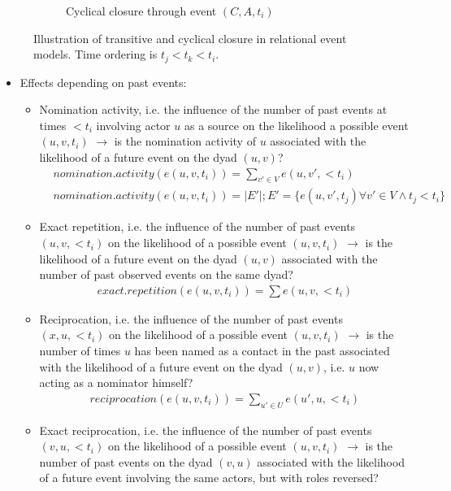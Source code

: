 \begin{figure}
\begin{subfigure}[t]{0.2\linewidth}
		\caption{Cyclical closure through event $(C,A,t_i)$}
	\end{subfigure}
	\caption{Illustration of transitive and cyclical closure in relational event models. Time ordering is $t_j < t_k < t_i$.}
	\label{fig:rem_closure}
\end{figure}

\begin{itemize}
	\item Effects depending on past events:
	\begin{itemize}
		\item Nomination activity, i.e. the influence of the number of past events at times $<t_i$ involving actor $u$ as a source on the likelihood a possible event $(u,v,t_i)$ $\rightarrow$ is the nomination activity of $u$ associated with the likelihood of a future event on the dyad $(u,v)$?
		\begin{align*}
			&nomination.activity(e(u,v,t_i)) = \sum_{v' \in V} e(u,v',<t_i)&&\\
			&nomination.activity(e(u,v,t_i)) = \lvert E' \rvert; E' = \{e(u,v',t_j) \forall v' \in V \land t_j < t_i\}
		\end{align*}
		\item Exact repetition, i.e. the influence of the number of past events $(u,v,<t_i)$ on the likelihood of a possible event $(u,v,t_i)$ $\rightarrow$ is the likelihood of a future event on the dyad $(u,v)$ associated with the number of past observed events on the same dyad?
		\begin{align*}
			exact.repetition(e(u,v,t_i)) = \sum e(u,v,<t_i)
		\end{align*}
		\item Reciprocation, i.e. the influence of the number of past events $(x,u,<t_i)$ on the likelihood of a possible event $(u,v,t_i)$ $\rightarrow$ is the number of times $u$ has been named as a contact in the past associated with the likelihood of a future event on the dyad $(u,v)$, i.e. $u$ now acting as a nominator himself?
		\begin{align*}
			reciprocation(e(u,v,t_i)) = \sum_{u' \in U} e(u',u,<t_i)
		\end{align*}
		\item Exact reciprocation, i.e. the influence of the number of past events $(v,u,<t_i)$ on the likelihood of a possible event $(u,v,t_i)$ $\rightarrow$ is the number of past events on the dyad $(v,u)$ associated with the likelihood of a future event involving the same actors, but with roles reversed?

\end{itemize}
\end{itemize}
